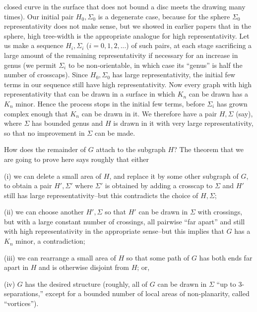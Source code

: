 \noindent closed curve in the surface that does not bound a disc meets the drawing many times). Our initial pair $H_0, \Sigma_0$ is a degenerate case, because for the sphere $\Sigma_0$ representativity does not make sense, but we showed in earlier papers that in the sphere, high tree-width is the appropriate analogue for high representativity. Let us make a sequence $H_i, \Sigma_i$ ($i = 0, 1, 2, ...$) of such pairs, at each stage sacrificing a large amount of the remaining representativity if necessary for an increase in genus (we permit $\Sigma_i$ to be non-orientable, in which case its ``genus'' is half the number of crosscaps). Since $H_0, \Sigma_0$ has large representativity, the initial few terms in our sequence still have high representativity. Now every graph with high representativity that can be drawn in a surface in which $K_n$ can be drawn has a $K_n$ minor. Hence the process stops in the initial few terms, before $\Sigma_i$ has grown complex enough that $K_n$ can be drawn in it. We therefore have a pair $H, \Sigma$ (say), where $\Sigma$ has bounded genus and $H$ is drawn in it with very large representativity, so that no improvement in $\Sigma$ can be made.

How does the remainder of $G$ attach to the subgraph $H$? The theorem that we are going to prove here says roughly that either

\hspace*{12pt}(i) we can delete a small area of $H$, and replace it by some other subgraph of $G$, to obtain a pair $H', \Sigma'$ where $\Sigma'$ is obtained by adding a crosscap to $\Sigma$ and $H'$ still has large representativity--but this contradicts the choice of $H, \Sigma$;

\hspace*{12pt}(ii) we can choose another $H', \Sigma$ so that $H'$ can be drawn in $\Sigma$ with crossings, but with a large constant number of crossings, all pairwise ``far apart'' and still with high representativity in the appropriate sense--but this implies that $G$ has a $K_n$ minor, a contradiction;

\hspace*{12pt}(iii) we can rearrange a small area of $H$ so that some path of $G$ has both ends far apart in $H$ and is otherwise disjoint from $H$; or,

\hspace*{12pt}(iv) $G$ has the desired structure (roughly, all of $G$ can be drawn in $\Sigma$ ``up to 3-separations,'' except for a bounded number of local areas of non-planarity, called ``vortices'').

